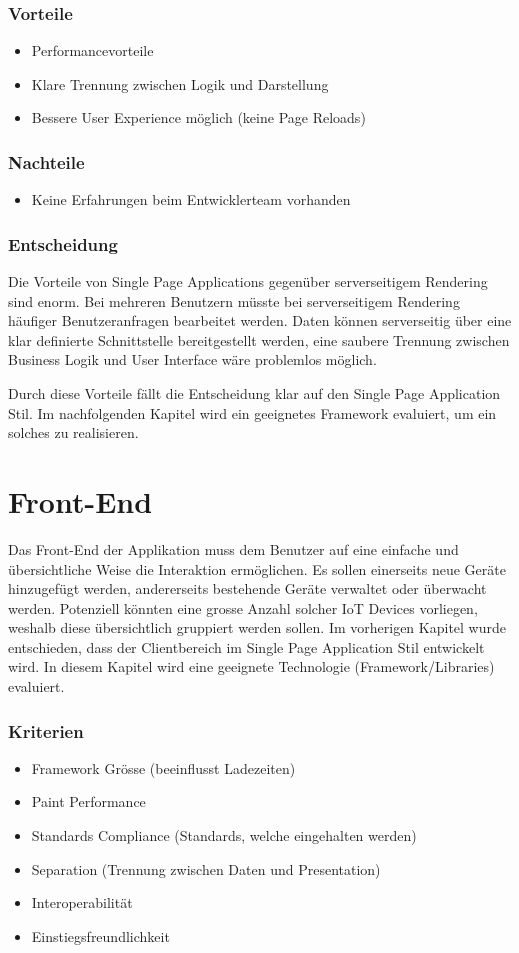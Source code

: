\subsubsection{Vorteile}
\begin{itemize}
\item Performancevorteile
\item Klare Trennung zwischen Logik und Darstellung
\item Bessere User Experience möglich (keine Page Reloads)
\end{itemize}
\subsubsection{Nachteile}
\begin{itemize}
\item Keine Erfahrungen beim Entwicklerteam vorhanden
\end{itemize}
\subsubsection{Entscheidung}
Die Vorteile von Single Page Applications gegenüber serverseitigem Rendering sind enorm. Bei mehreren Benutzern müsste bei serverseitigem Rendering häufiger Benutzeranfragen bearbeitet werden. Daten können serverseitig über eine klar definierte Schnittstelle bereitgestellt werden, eine saubere Trennung zwischen Business Logik und User Interface wäre problemlos möglich. 

Durch diese Vorteile fällt die Entscheidung klar auf den Single Page Application Stil. Im nachfolgenden Kapitel wird ein geeignetes Framework evaluiert, um ein solches zu realisieren.  
\newpage
\section{Front-End}
Das Front-End der Applikation muss dem Benutzer auf eine einfache und übersichtliche Weise die Interaktion ermöglichen. Es sollen einerseits neue Geräte hinzugefügt werden, andererseits bestehende Geräte verwaltet oder überwacht werden. Potenziell könnten eine grosse Anzahl solcher IoT Devices vorliegen, weshalb diese übersichtlich gruppiert werden sollen. Im vorherigen Kapitel wurde entschieden, dass der Clientbereich im Single Page Application Stil entwickelt wird. In diesem Kapitel wird eine geeignete Technologie (Framework/Libraries) evaluiert. 

\subsubsection{Kriterien}
\begin{itemize}
\item Framework Grösse (beeinflusst Ladezeiten)
\item Paint Performance
\item Standards Compliance (Standards, welche eingehalten werden)
\item Separation (Trennung zwischen Daten und Presentation)
\item Interoperabilität
\item Einstiegsfreundlichkeit
\end{itemize}

